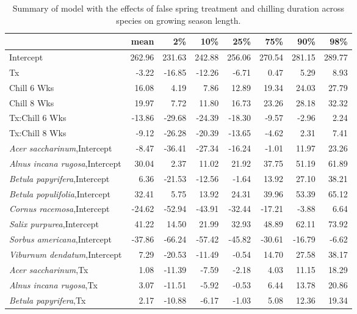 \documentclass{article}\usepackage[]{graphicx}\usepackage[]{color}
\begin{document}
\newpage
\begin{longtable}{lrrrrrrr}
\caption{Summary of model with the effects of false spring treatment and chilling duration across species on growing season length.} \\ 
  \hline
 & mean & 2\% & 10\% & 25\% & 75\% & 90\% & 98\% \\ 
  \hline \endhead  \hline
Intercept & 262.96 & 231.63 & 242.88 & 256.06 & 270.54 & 281.15 & 289.77 \\ 
  Tx & -3.22 & -16.85 & -12.26 & -6.71 & 0.47 & 5.29 & 8.93 \\ 
  Chill 6 Wks & 16.08 & 4.19 & 7.86 & 12.89 & 19.34 & 24.03 & 27.79 \\ 
  Chill 8 Wks & 19.97 & 7.72 & 11.80 & 16.73 & 23.26 & 28.18 & 32.32 \\ 
  Tx:Chill 6 Wks & -13.86 & -29.68 & -24.39 & -18.30 & -9.57 & -2.96 & 2.24 \\ 
  Tx:Chill 8 Wks & -9.12 & -26.28 & -20.39 & -13.65 & -4.62 & 2.31 & 7.41 \\ 
  \textit{Acer saccharinum},Intercept & -8.47 & -36.41 & -27.34 & -16.24 & -1.01 & 11.97 & 23.26 \\ 
  \textit{Alnus incana rugosa},Intercept & 30.04 & 2.37 & 11.02 & 21.92 & 37.75 & 51.19 & 61.89 \\ 
  \textit{Betula papyrifera},Intercept & 6.36 & -21.53 & -12.56 & -1.64 & 13.92 & 27.10 & 38.21 \\ 
  \textit{Betula populifolia},Intercept & 32.41 & 5.75 & 13.92 & 24.31 & 39.96 & 53.39 & 65.12 \\ 
  \textit{Cornus racemosa},Intercept & -24.62 & -52.94 & -43.91 & -32.44 & -17.21 & -3.88 & 6.64 \\ 
  \textit{Salix purpurea},Intercept & 41.22 & 14.50 & 21.99 & 32.93 & 48.89 & 62.11 & 73.92 \\ 
  \textit{Sorbus americana},Intercept & -37.86 & -66.24 & -57.42 & -45.82 & -30.61 & -16.79 & -6.62 \\ 
  \textit{Viburnum dendatum},Intercept & 7.29 & -20.53 & -11.49 & -0.54 & 14.70 & 27.58 & 38.17 \\ 
  \textit{Acer saccharinum},Tx & 1.08 & -11.39 & -7.59 & -2.18 & 4.03 & 11.15 & 18.29 \\ 
  \textit{Alnus incana rugosa},Tx & 3.07 & -11.51 & -5.92 & -0.53 & 6.44 & 13.78 & 20.86 \\ 
  \textit{Betula papyrifera},Tx & 2.17 & -10.88 & -6.17 & -1.03 & 5.08 & 12.36 & 19.34 \\ 

\end{longtable}
\end{document}

